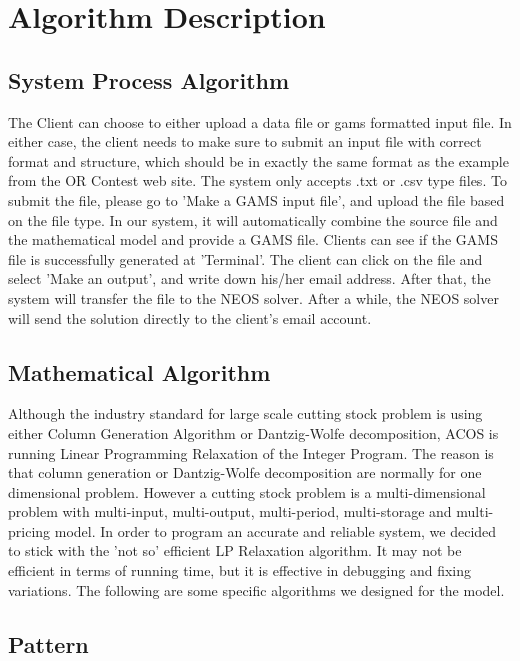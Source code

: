 \documentclass{article}[12pt]
\begin{document}
{\section{Algorithm Description} 

\subsection{System Process Algorithm}

The Client can choose to either upload a data file or gams formatted input file.  In either case, the client needs to make sure to submit an input file with correct format and structure, which should be in exactly the same format as the example from the OR Contest web site.  The system only accepts .txt or .csv type files.  To submit the file, please go to 'Make a GAMS input file', and upload the file based on the file type. In our system, it will automatically combine the source file and the mathematical model and provide a GAMS file.  Clients can see if the GAMS file is successfully generated at 'Terminal'.  The client can click on the file and select 'Make an output', and write down his/her email address.  After that, the system will transfer the file to the NEOS solver. After a while, the NEOS solver will send the solution directly to the client's email account.\\

\subsection{Mathematical Algorithm}

Although the industry standard for large scale cutting stock problem is using either Column Generation Algorithm or Dantzig-Wolfe decomposition, ACOS is running Linear Programming Relaxation of the Integer Program.  The reason is that column generation or Dantzig-Wolfe decomposition are normally for one dimensional problem.  However a cutting stock problem is a multi-dimensional problem with multi-input, multi-output, multi-period, multi-storage and multi-pricing model.  In order to program an accurate and reliable system, we decided to stick with the 'not so' efficient LP Relaxation algorithm.  It may not be efficient in terms of running time, but it is effective in debugging and fixing variations.  
The following are some specific algorithms we designed for the model. \\

\subsection{Pattern}

}
\end{document}
